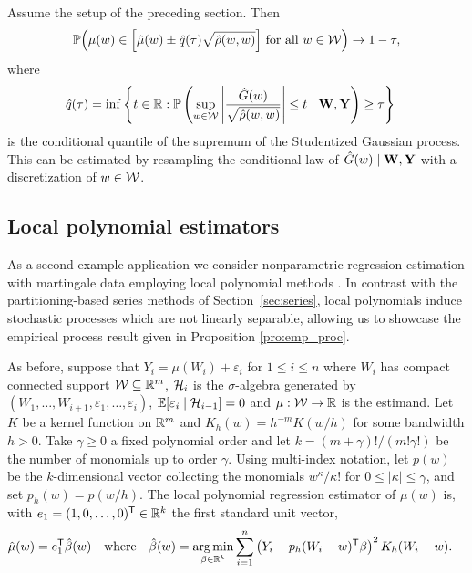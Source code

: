 \begin{proposition}%
  \label{pro:series_feasible}
  Assume the setup of the preceding section. Then
  \begin{align*}
    \mathbb{P}\Big(
      \mu(w) \in
      \Big[
        \hat\mu(w) \pm \hat q(\tau)
        \sqrt{\hat\rho(w,w)}
      \Big]
      \ \text{for all }
    w \in \mathcal{W} \Big)
    \to 1-\tau,
  \end{align*}
  where
  \vspace*{-2mm}
  \begin{align*}
    \hat{q}(\tau)
    &=
    \inf
    \left\{
      t \in \mathbb{R}:
      \mathbb{P}\left(
        \sup_{w \in \mathcal{W}}
        \left|
        \frac{\hat G(w)}{\sqrt{\hat\rho(w,w)}}
        \right|
        \leq t
        \Bigm| \mathbf{W}, \mathbf{Y}
      \right)
      \geq \tau
    \right\}
  \end{align*}
  is the conditional quantile of the supremum of the Studentized Gaussian
  process. This can be estimated by resampling the conditional law of
  $\hat G(w) \mid \mathbf{W}, \mathbf{Y}$ with a discretization of $w \in \mathcal{W}$.
\end{proposition}

\subsection{Local polynomial estimators}
\label{sec:local_poly}

As a second example application we consider nonparametric regression estimation
with martingale data employing local polynomial methods
\citep{Fan-Gijbels_1996_Book}. In contrast with the partitioning-based series
methods of Section~\ref{sec:series}, local polynomials induce stochastic
processes which are not linearly separable, allowing us to showcase the
empirical process result given in Proposition \ref{pro:emp_proc}.

As before, suppose that
$Y_i = \mu(W_i) + \varepsilon_i$
for $ 1 \leq i \leq n$
where $W_i$ has compact connected support $\mathcal{W} \subseteq \mathbb{R}^m$,
$\mathcal{H}_i$ is the $\sigma$-algebra generated by
$(W_1, \ldots, W_{i+1}, \varepsilon_1, \ldots, \varepsilon_i)$,
$\mathbb{E}[\varepsilon_i \mid \mathcal{H}_{i-1}] = 0$
and $\mu: \mathcal{W} \to \mathbb{R}$ is the estimand. Let $K$ be a kernel function on $\mathbb{R}^m$
and $K_h(w) = h^{-m} K(w/h)$
for some bandwidth $h > 0$.
Take $\gamma \geq 0$ a fixed polynomial order and let
$k = (m+\gamma)!/(m!\gamma!)$ be the number of monomials up to order $\gamma$.
Using multi-index notation,
let $p(w)$ be the $k$-dimensional vector
collecting the monomials $w^{\kappa}/\kappa!$
for $0 \leq |\kappa| \leq \gamma$,
and set $p_h(w) = p(w/h)$.
The local polynomial regression estimator of $\mu(w)$ is,
with $e_1 = (1, 0, \ldots, 0)^{\mathsf{T}} \in \mathbb{R}^k$ the first standard unit vector,
%
\begin{align*}
  \hat{\mu}(w)
  &=
  e_1^{\mathsf{T}}\hat{\beta}(w)
  &\text{where}      &
  &\hat{\beta}(w)
  &=
  \operatorname*{arg\,min}_{\beta \in \mathbb{R}^{k}}
  \sum_{i=1}^n
  \left(Y_i - p_h(W_i-w)^{\mathsf{T}} \beta \right)^2
  K_h(W_i-w).
\end{align*}

